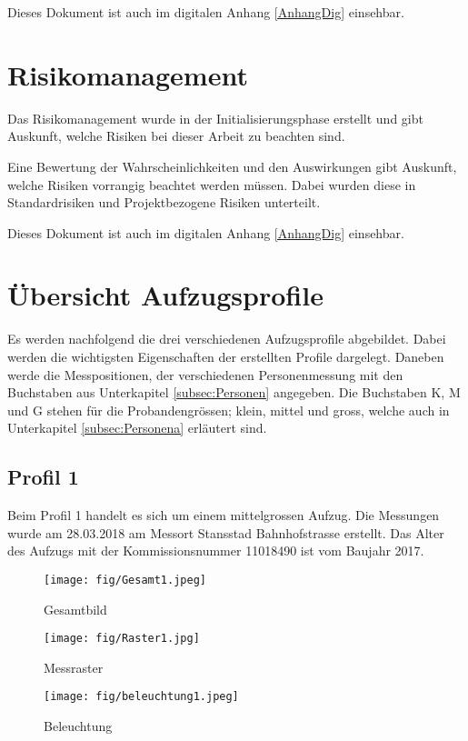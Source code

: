 Dieses Dokument ist auch im digitalen Anhang \ref{AnhangDig} einsehbar.


%

%



\chapter{Risikomanagement}
\label{AnhangC}
\setcounter{page}{9}
Das Risikomanagement wurde in der Initialisierungsphase erstellt und gibt Auskunft, welche Risiken bei dieser Arbeit zu beachten sind.

Eine Bewertung der Wahrscheinlichkeiten und den Auswirkungen gibt Auskunft, welche Risiken vorrangig beachtet werden müssen.  Dabei wurden diese in Standardrisiken und Projektbezogene Risiken unterteilt.

Dieses Dokument ist auch im digitalen Anhang \ref{AnhangDig} einsehbar.


\chapter{Übersicht Aufzugsprofile }
\label{AnhangD}

Es werden nachfolgend die drei verschiedenen Aufzugsprofile abgebildet. Dabei werden die wichtigsten Eigenschaften der erstellten Profile dargelegt. Daneben werde die Messpositionen, der verschiedenen Personenmessung mit den Buchstaben aus Unterkapitel \ref{subsec:Personen} angegeben. Die Buchstaben K, M und G stehen für die Probandengrössen; klein, mittel und gross, welche auch in  Unterkapitel \ref{subsec:Personena} erläutert sind.
\newpage


\section{Profil 1}
Beim Profil 1 handelt es sich um einem mittelgrossen Aufzug. Die Messungen wurde am 28.03.2018 am Messort Stansstad Bahnhofstrasse erstellt. Das Alter des Aufzugs mit der Kommissionsnummer 11018490 ist vom Baujahr 2017.
 


		\begin{figure}[!ht]
	\centering
	\begin{minipage}[b]{0.3\linewidth}
		\centering
		\texttt{[image: fig/Gesamt1.jpeg]}
		\caption{Gesamtbild}
		\label{fig:profilAnhang1}
	\end{minipage}
	\begin{minipage}[b]{0.3\linewidth}
		\centering
		\texttt{[image: fig/Raster1.jpg]}
		\caption{Messraster}
		\label{fig:profilAnhang2}
	\end{minipage}
	\begin{minipage}[b]{0.3\linewidth}
		\centering
		\texttt{[image: fig/beleuchtung1.jpeg]}
		\caption{Beleuchtung}
		\label{fig:profilAnhang3}
	\end{minipage}
\end{figure}

